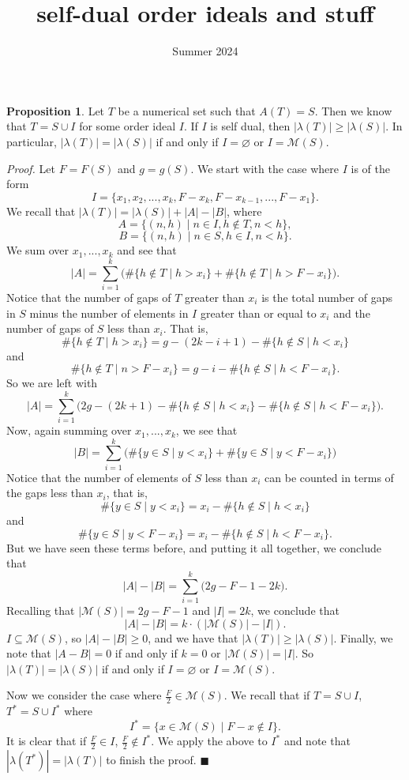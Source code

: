 \documentclass{article}
\title{self-dual order ideals and stuff}
\date{Summer 2024}
\theoremstyle{definition}
\theoremstyle{definition}
\theoremstyle{definition}
\newtheorem{prop}[thm]{Proposition}
\begin{document}
\maketitle

\begin{prop}
    Let $T$ be a numerical set such that $A(T) = S$. Then we know that $T = S\cup I$ for some order ideal $I$. If $I$ is self dual, then $|\lambda(T)| \geq |\lambda(S)|$. In particular, $|\lambda(T)| = |\lambda(S)|$ if and only if $I=\varnothing$ or $I = \mathcal{M}(S)$.
\bigskip

\textit{Proof.} Let $F= F(S)$ and $g = g(S)$.  We start with the case where $I$ is of the form
$$I =\{x_1, x_2, ..., x_k, F-x_k, F-x_{k-1}, ..., F-x_1\}.$$
We recall that $|\lambda(T)| = |\lambda(S)| + |A| - |B|$, where 
    $$A = \{(n, h)\mid n\in I, h\notin T, n <h\},$$
    $$B = \{(n, h)\mid n \in S, h\in I, n <h \}.$$
We sum over $x_1, ..., x_k$ and see that
$$|A| = \sum\limits_{i=1}^k \Biggl(\#\{h\notin T\mid h > x_i\} + \#\{h \notin T \mid h > F-x_i\}\Biggr).$$
Notice that the number of gaps of $T$ greater than $x_i$ is the total number of gaps in $S$ minus the number of elements in $I$ greater than or equal to $x_i$ and the number of gaps of $S$ less than $x_i$. That is, 
\begin{equation}
    \#\{h\notin T\mid h > x_i\} = g - (2k-i+1) - \#\{h \notin S \mid h < x_i\} \tag{$*$}
\end{equation}
and
$$\#\{h \notin T \mid n > F-x_i\} = g - i -\#\{h \notin S \mid h<F- x_i\}.$$
So we are left with 
$$|A| = \sum\limits_{i=1}^k \Biggl(2g -  (2k+1) - \#\{h \notin S \mid h < x_i\} - \#\{h \notin S \mid h<F- x_i\}\Biggr).$$
Now, again summing over $x_1, ..., x_k$, we see that
$$|B| = \sum\limits_{i=1}^k \Biggl(\#\{y \in S \mid y < x_i \} + \#\{y \in S \mid y < F-x_i \}\Biggr)$$
Notice that the number of elements of $S$ less than $x_i$ can be counted in terms of the gaps less than $x_i$, that is,
\begin{equation}
    \#\{y \in S \mid y < x_i \} = x_i - \#\{h \notin S \mid h<x_i\}\tag{$**$}
\end{equation}
and 
$$\#\{y \in S \mid y < F-x_i \} = x_i - \#\{h \notin S \mid h<F-x_i\}.$$
But we have seen these terms before, and putting it all together, we conclude that 
$$|A|-|B| = \sum\limits_{i=1}^k\Biggl(2g-F-1-2k\Biggr).$$
Recalling that $|\mathcal{M}(S)| = 2g-F-1$ and $|I| = 2k$, we conclude that 
    $$|A|-|B| = k\cdot(|\mathcal{M}(S)|-|I|).$$
$I \subseteq \mathcal{M}(S)$, so $|A|-|B| \geq 0$, and we have that $|\lambda(T)| \geq |\lambda(S)|$. Finally, we note that $|A-B| = 0$ if and only if $k=0$ or $|\mathcal{M}(S)| = |I|$. So $|\lambda(T)| = |\lambda(S)|$ if and only if $I = \varnothing$ or $I = \mathcal{M}(S)$. 

Now we consider the case where $\frac{F}{2} \in \mathcal{M}(S)$. We recall that if $T = S\cup I$, $T^* = S \cup I^*$ where 
$$I^* = \{x \in \mathcal{M}(S) \mid F-x \notin I\}.$$
It is clear that if $\frac{F}{2} \in I$, $\frac{F}{2}\notin I^*$. We apply the above to $I^*$ and note that $|\lambda(T^*)| = |\lambda(T)|$ to finish the proof. $\blacksquare$

\end{prop}
\end{document}
